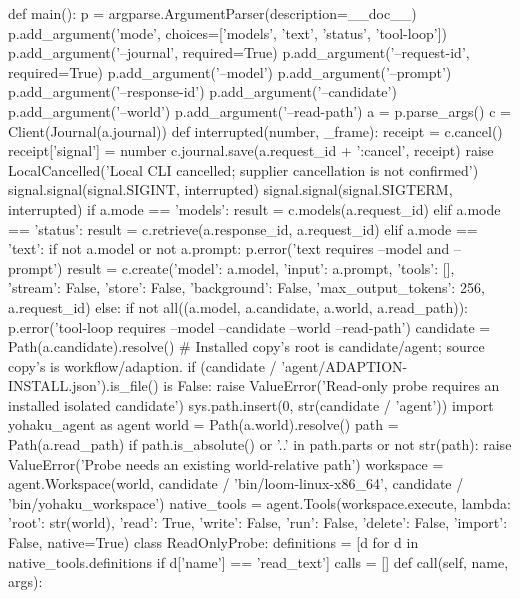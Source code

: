 {def main():
    p = argparse.ArgumentParser(description=__doc__)
    p.add_argument('mode', choices=['models', 'text', 'status', 'tool-loop'])
    p.add_argument('--journal', required=True)
    p.add_argument('--request-id', required=True)
    p.add_argument('--model')
    p.add_argument('--prompt')
    p.add_argument('--response-id')
    p.add_argument('--candidate')
    p.add_argument('--world')
    p.add_argument('--read-path')
    a = p.parse_args()
    c = Client(Journal(a.journal))
    def interrupted(number, _frame):
        receipt = c.cancel()
        receipt['signal'] = number
        c.journal.save(a.request_id + ':cancel', receipt)
        raise LocalCancelled('Local CLI cancelled; supplier cancellation is not confirmed')
    signal.signal(signal.SIGINT, interrupted)
    signal.signal(signal.SIGTERM, interrupted)
    if a.mode == 'models':
        result = c.models(a.request_id)
    elif a.mode == 'status':
        result = c.retrieve(a.response_id, a.request_id)
    elif a.mode == 'text':
        if not a.model or not a.prompt:
            p.error('text requires --model and --prompt')
        result = c.create({'model': a.model, 'input': a.prompt, 'tools': [],
                           'stream': False, 'store': False, 'background': False,
                           'max_output_tokens': 256}, a.request_id)
    else:
        if not all((a.model, a.candidate, a.world, a.read_path)):
            p.error('tool-loop requires --model --candidate --world --read-path')
        candidate = Path(a.candidate).resolve()
        # Installed copy's root is candidate/agent; source copy's is workflow/adaption.
        if (candidate / 'agent/ADAPTION-INSTALL.json').is_file() is False:
            raise ValueError('Read-only probe requires an installed isolated candidate')
        sys.path.insert(0, str(candidate / 'agent'))
        import yohaku_agent as agent
        world = Path(a.world).resolve()
        path = Path(a.read_path)
        if path.is_absolute() or '..' in path.parts or not str(path):
            raise ValueError('Probe needs an existing world-relative path')
        workspace = agent.Workspace(world, candidate / 'bin/loom-linux-x86_64', candidate / 'bin/yohaku_workspace')
        native_tools = agent.Tools(workspace.execute, lambda: {'root': str(world)},
                                   {'read': True, 'write': False, 'run': False, 'delete': False, 'import': False}, native=True)
        class ReadOnlyProbe:
            definitions = [d for d in native_tools.definitions if d['name'] == 'read_text']
            calls = []
            def call(self, name, args):
}
